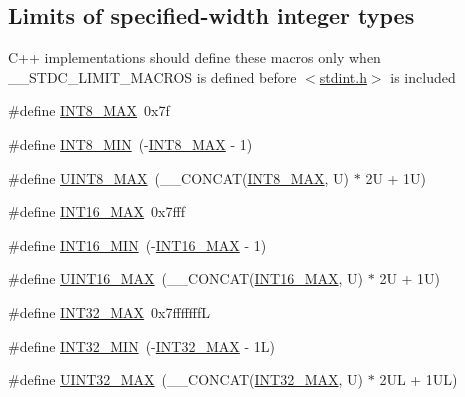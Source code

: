 \subsection*{Limits of specified-\/width integer types}
\label{_amgrp1a245ec86aeba6984a97d3762813e8b6}%
C++ implementations should define these macros only when \+\_\+\+\_\+\+S\+T\+D\+C\+\_\+\+L\+I\+M\+I\+T\+\_\+\+M\+A\+C\+R\+OS is defined before $<$\hyperlink{stdint_8h}{stdint.\+h}$>$ is included \begin{DoxyCompactItemize}
\item 
\#define \hyperlink{group__avr__stdint_gaaf7f29f45f1a513b4748a4e5014ddf6a}{I\+N\+T8\+\_\+\+M\+AX}~0x7f
\item 
\#define \hyperlink{group__avr__stdint_gaadcf2a81af243df333b31efa6461ab8e}{I\+N\+T8\+\_\+\+M\+IN}~(-\/\hyperlink{group__avr__stdint_gaaf7f29f45f1a513b4748a4e5014ddf6a}{I\+N\+T8\+\_\+\+M\+AX} -\/ 1)
\item 
\#define \hyperlink{group__avr__stdint_gaeb4e270a084ee26fe73e799861bd0252}{U\+I\+N\+T8\+\_\+\+M\+AX}~(\+\_\+\+\_\+\+C\+O\+N\+C\+AT(\hyperlink{group__avr__stdint_gaaf7f29f45f1a513b4748a4e5014ddf6a}{I\+N\+T8\+\_\+\+M\+AX}, U) $\ast$ 2\+U + 1\+U)
\item 
\#define \hyperlink{group__avr__stdint_gac58f2c111cc9989c86db2a7dc4fd84ca}{I\+N\+T16\+\_\+\+M\+AX}~0x7fff
\item 
\#define \hyperlink{group__avr__stdint_gad4e9955955b27624963643eac448118a}{I\+N\+T16\+\_\+\+M\+IN}~(-\/\hyperlink{group__avr__stdint_gac58f2c111cc9989c86db2a7dc4fd84ca}{I\+N\+T16\+\_\+\+M\+AX} -\/ 1)
\item 
\#define \hyperlink{group__avr__stdint_ga3ea490c9b3617d4479bd80ef93cd5602}{U\+I\+N\+T16\+\_\+\+M\+AX}~(\+\_\+\+\_\+\+C\+O\+N\+C\+AT(\hyperlink{group__avr__stdint_gac58f2c111cc9989c86db2a7dc4fd84ca}{I\+N\+T16\+\_\+\+M\+AX}, U) $\ast$ 2\+U + 1\+U)
\item 
\#define \hyperlink{group__avr__stdint_ga181807730d4a375f848ba139813ce04f}{I\+N\+T32\+\_\+\+M\+AX}~0x7fffffffL
\item 
\#define \hyperlink{group__avr__stdint_ga688eb21a22db27c2b2bd5836943cdcbe}{I\+N\+T32\+\_\+\+M\+IN}~(-\/\hyperlink{group__avr__stdint_ga181807730d4a375f848ba139813ce04f}{I\+N\+T32\+\_\+\+M\+AX} -\/ 1\+L)
\item 
\#define \hyperlink{group__avr__stdint_gab5eb23180f7cc12b7d6c04a8ec067fdd}{U\+I\+N\+T32\+\_\+\+M\+AX}~(\+\_\+\+\_\+\+C\+O\+N\+C\+AT(\hyperlink{group__avr__stdint_ga181807730d4a375f848ba139813ce04f}{I\+N\+T32\+\_\+\+M\+AX}, U) $\ast$ 2\+U\+L + 1\+U\+L)

\end{DoxyCompactItemize}
